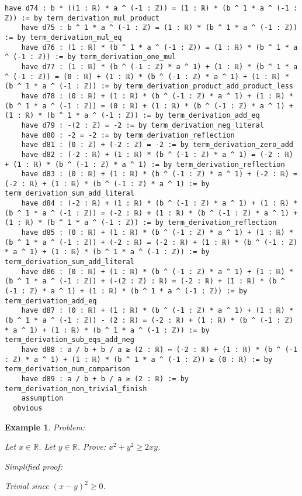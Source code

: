 \documentclass{article}
\newtheorem{example}{Example}
\begin{document}
\begin{tcolorbox}[colback=white!10, width=\linewidth]
\begin{lstlisting}[language=Lean4]
    have d74 : b * ((1 : ℝ) * a ^ (-1 : ℤ)) = (1 : ℝ) * (b ^ 1 * a ^ (-1 : ℤ)) := by term_derivation_mul_product
    have d75 : b ^ 1 * a ^ (-1 : ℤ) = (1 : ℝ) * (b ^ 1 * a ^ (-1 : ℤ)) := by term_derivation_mul_eq
    have d76 : (1 : ℝ) * (b ^ 1 * a ^ (-1 : ℤ)) = (1 : ℝ) * (b ^ 1 * a ^ (-1 : ℤ)) := by term_derivation_one_mul
    have d77 : (1 : ℝ) * (b ^ (-1 : ℤ) * a ^ 1) + (1 : ℝ) * (b ^ 1 * a ^ (-1 : ℤ)) = (0 : ℝ) + (1 : ℝ) * (b ^ (-1 : ℤ) * a ^ 1) + (1 : ℝ) * (b ^ 1 * a ^ (-1 : ℤ)) := by term_derivation_product_add_product_less
    have d78 : (0 : ℝ) + (1 : ℝ) * (b ^ (-1 : ℤ) * a ^ 1) + (1 : ℝ) * (b ^ 1 * a ^ (-1 : ℤ)) = (0 : ℝ) + (1 : ℝ) * (b ^ (-1 : ℤ) * a ^ 1) + (1 : ℝ) * (b ^ 1 * a ^ (-1 : ℤ)) := by term_derivation_add_eq
    have d79 : -(2 : ℤ) = -2 := by term_derivation_neg_literal
    have d80 : -2 = -2 := by term_derivation_reflection
    have d81 : (0 : ℤ) + (-2 : ℤ) = -2 := by term_derivation_zero_add
    have d82 : (-2 : ℝ) + (1 : ℝ) * (b ^ (-1 : ℤ) * a ^ 1) = (-2 : ℝ) + (1 : ℝ) * (b ^ (-1 : ℤ) * a ^ 1) := by term_derivation_reflection
    have d83 : (0 : ℝ) + (1 : ℝ) * (b ^ (-1 : ℤ) * a ^ 1) + (-2 : ℝ) = (-2 : ℝ) + (1 : ℝ) * (b ^ (-1 : ℤ) * a ^ 1) := by term_derivation_sum_add_literal
    have d84 : (-2 : ℝ) + (1 : ℝ) * (b ^ (-1 : ℤ) * a ^ 1) + (1 : ℝ) * (b ^ 1 * a ^ (-1 : ℤ)) = (-2 : ℝ) + (1 : ℝ) * (b ^ (-1 : ℤ) * a ^ 1) + (1 : ℝ) * (b ^ 1 * a ^ (-1 : ℤ)) := by term_derivation_reflection
    have d85 : (0 : ℝ) + (1 : ℝ) * (b ^ (-1 : ℤ) * a ^ 1) + (1 : ℝ) * (b ^ 1 * a ^ (-1 : ℤ)) + (-2 : ℝ) = (-2 : ℝ) + (1 : ℝ) * (b ^ (-1 : ℤ) * a ^ 1) + (1 : ℝ) * (b ^ 1 * a ^ (-1 : ℤ)) := by term_derivation_sum_add_literal
    have d86 : (0 : ℝ) + (1 : ℝ) * (b ^ (-1 : ℤ) * a ^ 1) + (1 : ℝ) * (b ^ 1 * a ^ (-1 : ℤ)) + (-(2 : ℤ) : ℝ) = (-2 : ℝ) + (1 : ℝ) * (b ^ (-1 : ℤ) * a ^ 1) + (1 : ℝ) * (b ^ 1 * a ^ (-1 : ℤ)) := by term_derivation_add_eq
    have d87 : (0 : ℝ) + (1 : ℝ) * (b ^ (-1 : ℤ) * a ^ 1) + (1 : ℝ) * (b ^ 1 * a ^ (-1 : ℤ)) - (2 : ℝ) = (-2 : ℝ) + (1 : ℝ) * (b ^ (-1 : ℤ) * a ^ 1) + (1 : ℝ) * (b ^ 1 * a ^ (-1 : ℤ)) := by term_derivation_sub_eqs_add_neg
    have d88 : a / b + b / a ≥ (2 : ℝ) ↔ (-2 : ℝ) + (1 : ℝ) * (b ^ (-1 : ℤ) * a ^ 1) + (1 : ℝ) * (b ^ 1 * a ^ (-1 : ℤ)) ≥ (0 : ℝ) := by term_derivation_num_comparison
    have d89 : a / b + b / a ≥ (2 : ℝ) := by term_derivation_non_trivial_finish
    assumption
  obvious

\end{lstlisting}
\end{tcolorbox}


\begin{example}
Problem:
\begin{tcolorbox}[colback=yellow!10, width=\linewidth]
Let $x\in\mathbb{R}$. Let $y\in\mathbb{R}$.
    Prove: $x^2 + y^2 \ge 2xy$.
\end{tcolorbox}

Simplified proof:
\begin{tcolorbox}[colback=blue!10, width=\linewidth]
Trivial since $(x-y)^2 \ge 0$.
\end{tcolorbox}
\end{example}
\end{document}
